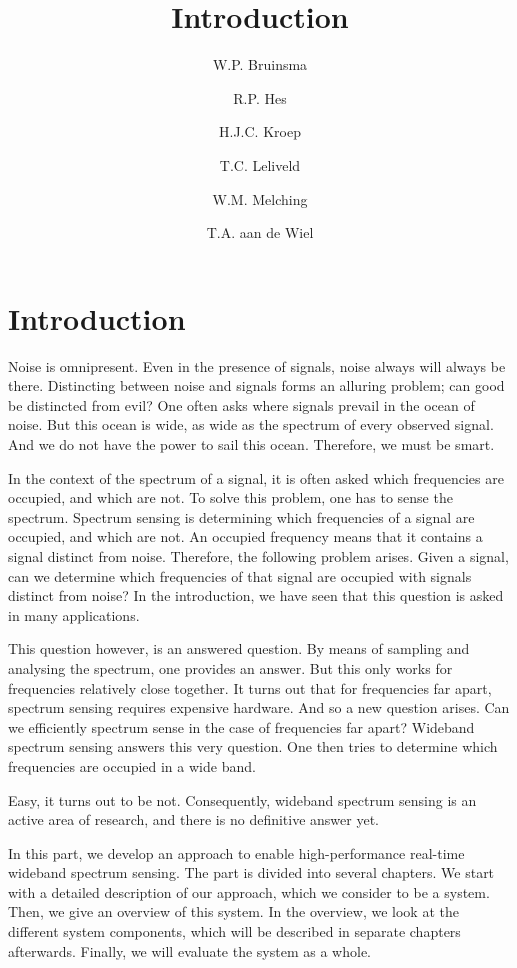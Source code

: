 \documentclass[a4paper, openany, oneside]{memoir}
\title{Introduction}
\author{W.P. Bruinsma \and R.P. Hes \and H.J.C. Kroep \and T.C. Leliveld \and W.M. Melching \and T.A. aan de Wiel}
\begin{document}
\chapter{Introduction}
Noise is omnipresent. Even in the presence of signals, noise always will always be there. Distincting between noise and signals forms an alluring problem; can good be distincted from evil? One often asks where signals prevail in the ocean of noise. But this ocean is wide, as wide as the spectrum of every observed signal. And we do not have the power to sail this ocean. Therefore, we must be smart.

In the context of the spectrum of a signal, it is often asked which frequencies are occupied, and which are not. To solve this problem, one has to sense the spectrum. Spectrum sensing is determining which frequencies of a signal are occupied, and which are not. An occupied frequency means that it contains a signal distinct from noise. Therefore, the following problem arises. Given a signal, can we determine which frequencies of that signal are occupied with signals distinct from noise? In the introduction, we have seen that this question is asked in many applications.

This question however, is an answered question. By means of sampling and analysing the spectrum, one provides an answer. But this only works for frequencies relatively close together. It turns out that for frequencies far apart, spectrum sensing requires expensive hardware. And so a new question arises. Can we efficiently spectrum sense in the case of frequencies far apart? Wideband spectrum sensing answers this very question. One then tries to determine which frequencies are occupied in a wide band.

Easy, it turns out to be not. Consequently, wideband spectrum sensing is an active area of research, and there is no definitive answer yet.

In this part, we develop an approach to enable high-performance real-time wideband spectrum sensing. The part is divided into several chapters. We start with a detailed description of our approach, which we consider to be a system. Then, we give an overview of this system. In the overview, we look at the different system components, which will be described in separate chapters afterwards. Finally, we will evaluate the system as a whole.
\end{document}
